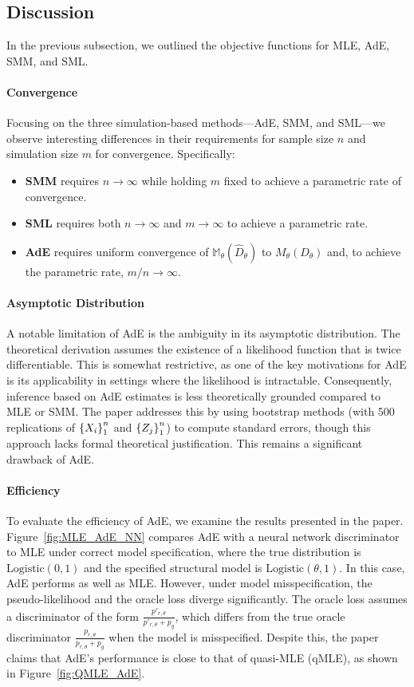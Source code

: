 \documentclass[12pt]{article}
\begin{document}
\subsection{Discussion} \label{subsec:discussion}

In the previous subsection, we outlined the objective functions for MLE, AdE,
SMM, and SML.
\paragraph{Convergence} Focusing on the three simulation-based methods—AdE, SMM,
and SML—we observe interesting differences in their requirements for sample
size \(n\) and simulation size \(m\) for convergence. Specifically:

\begin{itemize}
    \item \textbf{SMM} requires \(n \to \infty\) while holding \(m\) fixed to achieve a parametric rate of convergence.
    \item \textbf{SML} requires both \(n \to \infty\) and \(m \to \infty\) to achieve a parametric rate.
    \item \textbf{AdE} requires uniform convergence of \(\mathbb{M}_\theta(\hat{D}_\theta)\) to \(M_\theta(D_\theta)\) and, to achieve the parametric rate, \(m/n \to \infty\).
\end{itemize}

\paragraph{Asymptotic Distribution}
A notable limitation of AdE is the ambiguity in its asymptotic distribution.
The theoretical derivation assumes the existence of a likelihood function that
is twice differentiable. This is somewhat restrictive, as one of the key
motivations for AdE is its applicability in settings where the likelihood is
intractable. Consequently, inference based on AdE estimates is less
theoretically grounded compared to MLE or SMM. The paper addresses this by
using bootstrap methods (with 500 replications of \(\left\{X_i\right\}_1^n\) and
\(\left\{Z_j\right\}_1^n\)) to compute standard errors, though this approach lacks
formal theoretical justification. This remains a significant drawback of AdE.

\paragraph{Efficiency}
To evaluate the efficiency of AdE, we examine the results presented in the
paper. Figure~\ref{fig:MLE_AdE_NN} compares AdE with a neural network
discriminator to MLE under correct model specification, where the true
distribution is \(\text{Logistic}(0,1)\) and the specified structural model is
\(\text{Logistic}(\theta,1)\). In this case, AdE performs as well as MLE.
However, under model misspecification, the pseudo-likelihood and the oracle
loss diverge significantly. The oracle loss assumes a discriminator of the form
\(\frac{p'_{r,\theta}}{p'_{r,\theta}+p_g}\), which differs from the true oracle
discriminator \(\frac{p_{r,\theta}}{p_{r,\theta}+p_g}\) when the model is
misspecified. Despite this, the paper claims that AdE's performance is close to
that of quasi-MLE (qMLE), as shown in Figure~\ref{fig:QMLE_AdE}.
\end{document}
